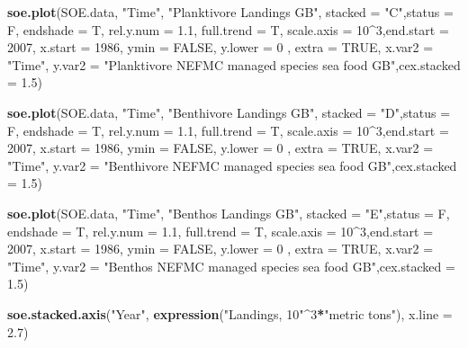 \documentclass[]{article}
\newenvironment{Shaded}{\begin{snugshade}}{\end{snugshade}}
\newcommand{\KeywordTok}[1]{\textcolor[rgb]{0.13,0.29,0.53}{\textbf{#1}}}
\newcommand{\DataTypeTok}[1]{\textcolor[rgb]{0.13,0.29,0.53}{#1}}
\newcommand{\DecValTok}[1]{\textcolor[rgb]{0.00,0.00,0.81}{#1}}
\newcommand{\FloatTok}[1]{\textcolor[rgb]{0.00,0.00,0.81}{#1}}
\newcommand{\StringTok}[1]{\textcolor[rgb]{0.31,0.60,0.02}{#1}}
\newcommand{\OtherTok}[1]{\textcolor[rgb]{0.56,0.35,0.01}{#1}}
\newcommand{\OperatorTok}[1]{\textcolor[rgb]{0.81,0.36,0.00}{\textbf{#1}}}
\newcommand{\NormalTok}[1]{#1}
\begin{document}
\begin{Shaded}
\begin{Highlighting}[]
\KeywordTok{soe.plot}\NormalTok{(SOE.data, }\StringTok{"Time"}\NormalTok{, }\StringTok{"Planktivore Landings GB"}\NormalTok{, }\DataTypeTok{stacked =} \StringTok{"C"}\NormalTok{,}\DataTypeTok{status =}\NormalTok{ F,}
         \DataTypeTok{endshade =}\NormalTok{ T, }\DataTypeTok{rel.y.num =} \FloatTok{1.1}\NormalTok{, }\DataTypeTok{full.trend =}\NormalTok{ T, }\DataTypeTok{scale.axis =} \DecValTok{10}\OperatorTok{^}\DecValTok{3}\NormalTok{,}\DataTypeTok{end.start =} \DecValTok{2007}\NormalTok{, }\DataTypeTok{x.start =} \DecValTok{1986}\NormalTok{,}
         \DataTypeTok{ymin =} \OtherTok{FALSE}\NormalTok{, }\DataTypeTok{y.lower =} \DecValTok{0}\NormalTok{ , }\DataTypeTok{extra =} \OtherTok{TRUE}\NormalTok{, }\DataTypeTok{x.var2 =} \StringTok{"Time"}\NormalTok{, }
         \DataTypeTok{y.var2 =} \StringTok{"Planktivore NEFMC managed species sea food GB"}\NormalTok{,}\DataTypeTok{cex.stacked =} \FloatTok{1.5}\NormalTok{)}

\KeywordTok{soe.plot}\NormalTok{(SOE.data, }\StringTok{"Time"}\NormalTok{, }\StringTok{"Benthivore Landings GB"}\NormalTok{, }\DataTypeTok{stacked =} \StringTok{"D"}\NormalTok{,}\DataTypeTok{status =}\NormalTok{ F,}
         \DataTypeTok{endshade =}\NormalTok{ T, }\DataTypeTok{rel.y.num =} \FloatTok{1.1}\NormalTok{, }\DataTypeTok{full.trend =}\NormalTok{ T, }\DataTypeTok{scale.axis =} \DecValTok{10}\OperatorTok{^}\DecValTok{3}\NormalTok{,}\DataTypeTok{end.start =} \DecValTok{2007}\NormalTok{, }\DataTypeTok{x.start =} \DecValTok{1986}\NormalTok{,}
         \DataTypeTok{ymin =} \OtherTok{FALSE}\NormalTok{, }\DataTypeTok{y.lower =} \DecValTok{0}\NormalTok{ , }\DataTypeTok{extra =} \OtherTok{TRUE}\NormalTok{, }\DataTypeTok{x.var2 =} \StringTok{"Time"}\NormalTok{, }
         \DataTypeTok{y.var2 =} \StringTok{"Benthivore NEFMC managed species sea food GB"}\NormalTok{,}\DataTypeTok{cex.stacked =} \FloatTok{1.5}\NormalTok{)}

\KeywordTok{soe.plot}\NormalTok{(SOE.data, }\StringTok{"Time"}\NormalTok{, }\StringTok{"Benthos Landings GB"}\NormalTok{, }\DataTypeTok{stacked =} \StringTok{"E"}\NormalTok{,}\DataTypeTok{status =}\NormalTok{ F,}
         \DataTypeTok{endshade =}\NormalTok{ T, }\DataTypeTok{rel.y.num =} \FloatTok{1.1}\NormalTok{, }\DataTypeTok{full.trend =}\NormalTok{ T, }\DataTypeTok{scale.axis =} \DecValTok{10}\OperatorTok{^}\DecValTok{3}\NormalTok{,}\DataTypeTok{end.start =} \DecValTok{2007}\NormalTok{, }\DataTypeTok{x.start =} \DecValTok{1986}\NormalTok{,}
         \DataTypeTok{ymin =} \OtherTok{FALSE}\NormalTok{, }\DataTypeTok{y.lower =} \DecValTok{0}\NormalTok{ , }\DataTypeTok{extra =} \OtherTok{TRUE}\NormalTok{, }\DataTypeTok{x.var2 =} \StringTok{"Time"}\NormalTok{, }
         \DataTypeTok{y.var2 =} \StringTok{"Benthos NEFMC managed species sea food GB"}\NormalTok{,}\DataTypeTok{cex.stacked =} \FloatTok{1.5}\NormalTok{)}

\KeywordTok{soe.stacked.axis}\NormalTok{(}\StringTok{"Year"}\NormalTok{, }\KeywordTok{expression}\NormalTok{(}\StringTok{"Landings, 10"}\OperatorTok{^}\DecValTok{3}\OperatorTok{*}\StringTok{"metric tons"}\NormalTok{), }\DataTypeTok{x.line =} \FloatTok{2.7}\NormalTok{)}
\end{Highlighting}
\end{Shaded}
\end{document}
